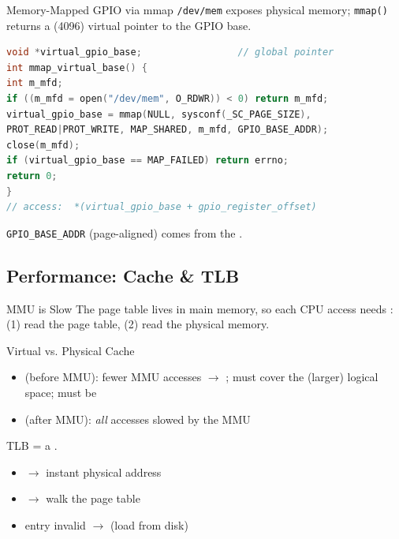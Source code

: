 
\begin{KR}{Memory-Mapped GPIO via mmap}
    \texttt{/dev/mem} exposes physical memory; \texttt{mmap()} returns a
     (4096) virtual pointer to the GPIO base.
\begin{lstlisting}[language=C, style=basesmol, aboveskip=2pt, belowskip=2pt]
void *virtual_gpio_base;                 // global pointer
int mmap_virtual_base() {
int m_mfd;
if ((m_mfd = open("/dev/mem", O_RDWR)) < 0) return m_mfd;
virtual_gpio_base = mmap(NULL, sysconf(_SC_PAGE_SIZE),
PROT_READ|PROT_WRITE, MAP_SHARED, m_mfd, GPIO_BASE_ADDR);
close(m_mfd);
if (virtual_gpio_base == MAP_FAILED) return errno;
return 0;
}
// access:  *(virtual_gpio_base + gpio_register_offset)
\end{lstlisting}
    \texttt{GPIO\_BASE\_ADDR} (page-aligned) comes from the .
\end{KR}

\subsection{Performance: Cache \& TLB}

\begin{concept}{MMU is Slow}
    The page table lives in main memory, so each CPU access needs : (1) read the page table, (2) read the physical memory.
\end{concept}


\begin{definition}{Virtual vs. Physical Cache}
    \begin{itemize}
        \item {} (before MMU): fewer MMU accesses $\to$
              ; must cover the (larger) logical space; must be
        \item {} (after MMU): \emph{all} accesses slowed by
              the MMU
    \end{itemize}
\end{definition}

\begin{definition}{TLB}
     = a .
    \begin{itemize}
        \item {} $\to$ instant physical address
        \item {} $\to$ walk the page table
        \item entry invalid $\to$  (load from disk)
    \end{itemize}
\end{definition}

